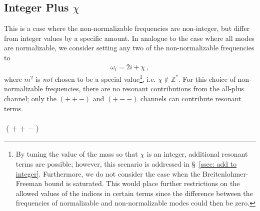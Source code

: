 \documentclass[letterpaper,11pt]{article}
\newcommand{\oi}{\omega_i}
\begin{document}
\subsection{Integer Plus $\chi$}

This is a case where the non-normalizable frequencies are non-integer, but differ from integer values by a specific amount. In analogue to the case where all modes are normalizable, we consider setting any two of the non-normalizable frequencies to
\begin{align}
\oi = 2i + \chi \, ,
\end{align}
where $m^2$ is \emph{not} chosen to be a special value\footnote{By tuning the value of the mass so that $\chi$ is an integer, additional resonant terms are possible; however, this scenario is addressed in \S\!~\ref{ssec: add to integer}. Furthermore, we do not consider the case when the Breitenlohmer-Freeman bound is saturated. This would place further restrictions on the allowed values of the indices in certain terms since the difference between the frequencies of normalizable and non-normalizable modes could then be zero.}, i.e. $\chi \notin \mathbb{Z}^*$. For this choice of non-normalizable frequencies, there are no resonant contributions from the all-plus channel; only the $(++-)$ and $(+--)$ channels can contribute resonant terms.

\subsubsection{$(++-)$}
\end{document}
